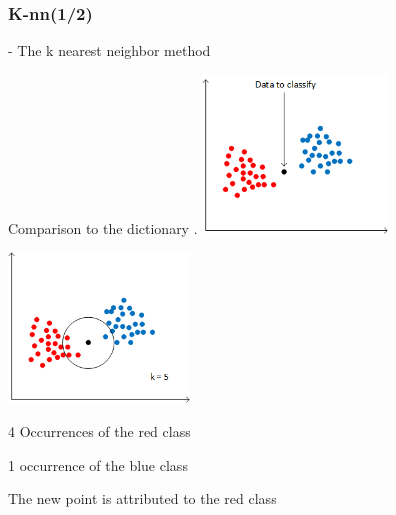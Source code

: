\documentclass[xcolor=table]{beamer}
\begin{document}
\begin{frame}\frametitle{K-nn(1/2)}


- The k nearest neighbor method

\begin{itemize}
\item<1-> Comparison to the dictionary .
 {\includegraphics[height=4.2cm]{knnwc.png}} %
 {\includegraphics[height=4cm]{knnac.png}
\item 4 Occurrences of {the \color{red} red} class 
\item 1 occurrence of {the \color{blue} blue} class 
\item The new point is attributed to {the \color{red} red} class}
\end{itemize}

\end{frame}
\end{document}
